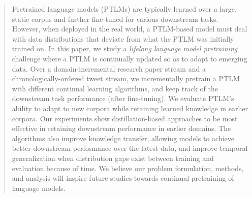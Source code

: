 \begin{abstract}
Pretrained language models (PTLMs) are typically learned over a large, static corpus and further fine-tuned for various downstream tasks.
However, when deployed in the real world, a PTLM-based model must deal with data distributions that deviate from what the PTLM was initially trained on. %
In this paper, we study a \textit{lifelong language model pretraining} challenge where a PTLM is continually updated so as to adapt to emerging data. 
Over a domain-incremental research paper stream and a chronologically-ordered tweet stream, we incrementally pretrain a PTLM with different continual learning algorithms, and keep track of the downstream task performance (after fine-tuning). We evaluate PTLM's ability to adapt to new corpora while retaining learned knowledge in earlier corpora.
Our experiments show distillation-based approaches to be most effective in retaining downstream performance in earlier domains. The algorithms also improve knowledge transfer, allowing models to achieve better downstream performance over the latest data, and improve temporal generalization when distribution gaps exist between training and evaluation because of time.
We believe our problem formulation, methods, and analysis will inspire future studies towards continual pretraining of language models.



\end{abstract}